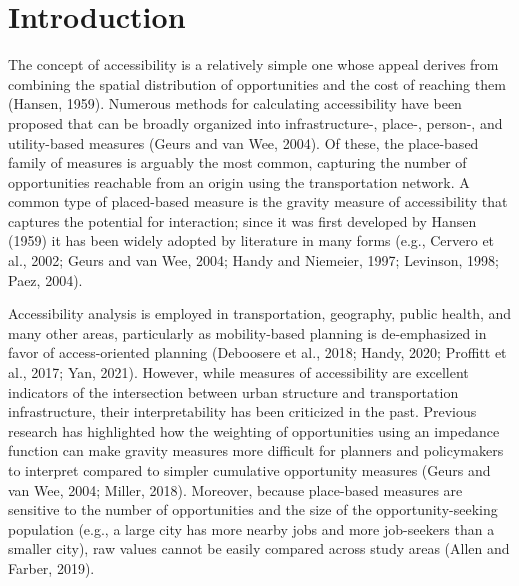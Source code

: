 \documentclass[]{elsarticle} %
\begin{document}
\newpage

\hypertarget{introduction}{%
\section{Introduction}\label{introduction}}

The concept of accessibility is a relatively simple one whose appeal
derives from combining the spatial distribution of opportunities and the
cost of reaching them (Hansen, 1959). Numerous methods for calculating
accessibility have been proposed that can be broadly organized into
infrastructure-, place-, person-, and utility-based measures (Geurs and
van Wee, 2004). Of these, the place-based family of measures is arguably
the most common, capturing the number of opportunities reachable from an
origin using the transportation network. A common type of placed-based
measure is the gravity measure of accessibility that captures the
potential for interaction; since it was first developed by Hansen (1959)
it has been widely adopted by literature in many forms (e.g., Cervero et
al., 2002; Geurs and van Wee, 2004; Handy and Niemeier, 1997; Levinson,
1998; Paez, 2004).

Accessibility analysis is employed in transportation, geography, public
health, and many other areas, particularly as mobility-based planning is
de-emphasized in favor of access-oriented planning (Deboosere et al.,
2018; Handy, 2020; Proffitt et al., 2017; Yan, 2021). However, while
measures of accessibility are excellent indicators of the intersection
between urban structure and transportation infrastructure, their
interpretability has been criticized in the past. Previous research has
highlighted how the weighting of opportunities using an impedance
function can make gravity measures more difficult for planners and
policymakers to interpret compared to simpler cumulative opportunity
measures (Geurs and van Wee, 2004; Miller, 2018). Moreover, because
place-based measures are sensitive to the number of opportunities and
the size of the opportunity-seeking population (e.g., a large city has
more nearby jobs and more job-seekers than a smaller city), raw values
cannot be easily compared across study areas (Allen and Farber, 2019).
\end{document}

